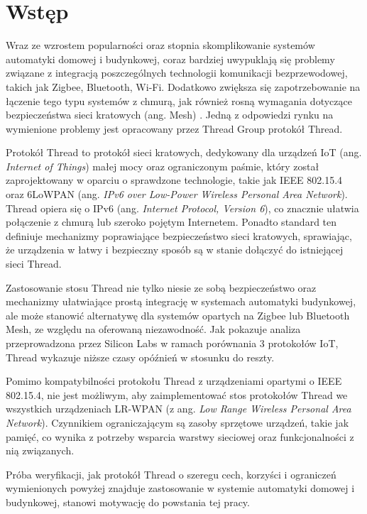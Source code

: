 \section*{Wstęp}
\label{cha:wstep}

Wraz ze wzrostem popularności oraz stopnia skomplikowanie systemów automatyki domowej i budynkowej, coraz bardziej uwypuklają się problemy związane z integracją poszczególnych technologii komunikacji bezprzewodowej, takich jak Zigbee, Bluetooth, Wi-Fi. Dodatkowo zwiększa się zapotrzebowanie na łączenie tego typu systemów z chmurą, jak również rosną wymagania dotyczące bezpieczeństwa sieci kratowych (ang. Mesh) \cite{thread-smart-home}. Jedną z odpowiedzi rynku na wymienione problemy jest opracowany przez Thread Group protokół Thread.

Protokół Thread to protokół sieci kratowych, dedykowany dla urządzeń IoT (ang. \textit{Internet of Things}) małej mocy oraz ograniczonym paśmie, który został zaprojektowany w oparciu o sprawdzone technologie, takie jak IEEE 802.15.4 oraz 6LoWPAN (ang. \textit{IPv6 over Low-Power Wireless Personal Area Network}). Thread opiera się o IPv6 (ang. \textit{Internet Protocol, Version 6}), co znacznie ułatwia połączenie z chmurą lub szeroko pojętym Internetem. Ponadto standard ten definiuje mechanizmy poprawiające bezpieczeństwo sieci kratowych, sprawiając, że urządzenia w łatwy i bezpieczny sposób są w stanie dołączyć do istniejącej sieci Thread.

Zastosowanie stosu Thread nie tylko niesie ze sobą bezpieczeństwo oraz mechanizmy ułatwiające prostą integrację w systemach automatyki budynkowej, ale może stanowić alternatywę dla systemów opartych na Zigbee lub Bluetooth Mesh, ze względu na oferowaną niezawodność. Jak pokazuje analiza przeprowadzona przez Silicon Labs \cite{thread-bt-zigbee-comparison} w ramach porównania 3 protokołów IoT, Thread wykazuje niższe czasy opóźnień w stosunku do reszty.

Pomimo kompatybilności protokołu Thread z urządzeniami opartymi o IEEE 802.15.4, nie jest możliwym, aby zaimplementować stos protokołów Thread we wszystkich urządzeniach LR-WPAN (z ang. \textit{Low Range Wireless Personal Area Network}). Czynnikiem ograniczającym są zasoby sprzętowe urządzeń, takie jak pamięć, co wynika z potrzeby wsparcia warstwy sieciowej oraz funkcjonalności z nią związanych.

Próba weryfikacji, jak protokół Thread o szeregu cech, korzyści i ograniczeń wymienionych powyżej znajduje zastosowanie w systemie automatyki domowej i budynkowej, stanowi motywację do powstania tej pracy.

